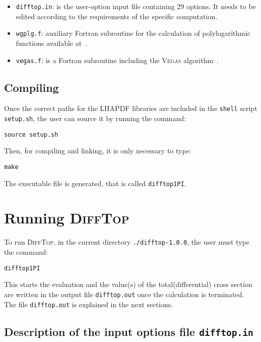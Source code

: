 \documentclass[11pt]{article}
\begin{document}
{\begin{itemize}
\item \texttt{difftop.in}: is the user-option input file containing 29 options. It needs to be edited 
according to the requirements of the specific computation.  

\item \texttt{wgplg.f}: auxiliary Fortran subroutine for the calculation 
of polylogarithmic functions available at~\cite{wgplg}.

\item \texttt{vegas.f}: is a Fortran subroutine including the \textsc{Vegas} 
algorithm~\cite{Lepage:1977sw,Lepage:1980dq,Press:1992zz}.

 
\end{itemize}



\subsection{Compiling}\label{sec:Compiling}

Once the correct paths for the LHAPDF libraries are included in the \texttt{shell} script \texttt{setup.sh},  
the user can source it by running the command:
\begin{verbatim}
source setup.sh
\end{verbatim}

Then, for compiling and linking, it is only necessary to type: 
\begin{verbatim}
make
\end{verbatim}

The executable file is generated, that is called \texttt{difftop1PI}.


\section{Running \textsc{DiffTop}}\label{sec:Running DiffTop}

To run \textsc{DiffTop}, in the current directory \texttt{./difftop-1.0.0},
the user must type the command:
\begin{verbatim}
difftop1PI
\end{verbatim}
This starts the evaluation and the value(s) of the total(differential) cross section 
are written in the output file \texttt{difftop.out} once the calculation is terminated.
The file \texttt{difftop.out} is explained in the next sections.


\subsection{Description of the input options file \texttt{difftop.in}}\label{sec:Description of the input options}

}
\end{document}
